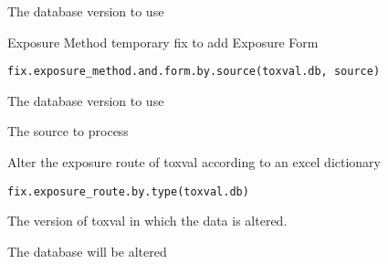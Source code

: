 \documentclass[letterpaper]{book}
\begin{document}
%
\begin{Arguments}
\begin{ldescription}
\item[\code{toxval.db}] The database version to use
\end{ldescription}
\end{Arguments}
%
\begin{Description}\relax
Exposure Method temporary fix to add Exposure Form
\end{Description}
%
\begin{Usage}
\begin{verbatim}
fix.exposure_method.and.form.by.source(toxval.db, source)
\end{verbatim}
\end{Usage}
%
\begin{Arguments}
\begin{ldescription}
\item[\code{toxval.db}] The database version to use

\item[\code{source}] The source to process
\end{ldescription}
\end{Arguments}
%
\begin{Description}\relax
Alter the exposure route of toxval according to an excel dictionary
\end{Description}
%
\begin{Usage}
\begin{verbatim}
fix.exposure_route.by.type(toxval.db)
\end{verbatim}
\end{Usage}
%
\begin{Arguments}
\begin{ldescription}
\item[\code{toxval.db}] The version of toxval in which the data is altered.
\end{ldescription}
\end{Arguments}
%
\begin{Value}
The database will be altered
\end{Value}
\end{document}
